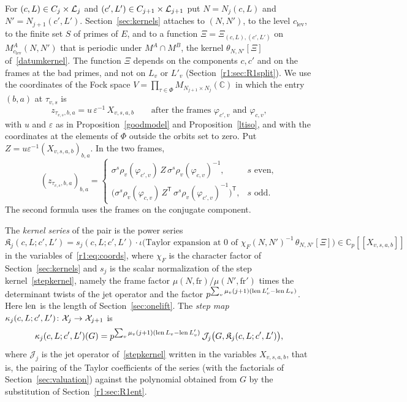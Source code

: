 For $(c,L)\in C_j\times\mathcal L_j$ and $(c',L')\in C_{j+1}\times\mathcal L_{j+1}$ put $N=N_j(c,L)$ and $N'=N_{j+1}(c',L')$. Section~\ref{sec:kernels} attaches to $(N,N')$, to the level $c_{\mathrm{lev}}$, to the finite set $S$ of primes of $E$, and to a function $\Xi=\Xi_{(c,L),(c',L')}$ on $M^A_{c_{\mathrm{lev}}}(N,N')$ that is periodic under $M^A\cap M^B$, the kernel $\theta_{N,N'}[\Xi]$ of~\eqref{datumkernel}. The function $\Xi$ depends on the components $c,c'$ and on the frames at the bad primes, and not on $L_v$ or $L'_v$ (Section~\ref{r1:sec:R1split}). We use the coordinates of the Fock space $V=\prod_{\tau\in\Phi}M_{N_{j+1}\times N_j}(\mathbb C)$ in which the entry $(b,a)$ at $\tau_{v,s}$ is
\begin{equation}\label{r1:eq:coords}
z_{\tau_{v,s},b,a}=u\,\varepsilon^{-1}\,X_{v,s,a,b}\qquad\text{after the frames }\varphi_{c',v}\text{ and }\varphi_{c,v},
\end{equation}
with $u$ and $\varepsilon$ as in Proposition~\ref{goodmodel} and Proposition~\ref{ltiso}, and with the coordinates at the elements of $\Phi$ outside the orbits set to zero. Put $Z=u\varepsilon^{-1}(X_{v,s,a,b})_{b,a}$. In the two frames,
\[
 (z_{\tau_{v,s},b,a})_{b,a}=
 \begin{cases}
 \sigma^s\rho_v(\varphi_{c',v})\,Z\,\sigma^s\rho_v(\varphi_{c,v})^{-1}, & s\text{ even},\\
 \big(\sigma^s\rho_v(\varphi_{c,v})\,Z^{\mathsf T}\,\sigma^s\rho_v(\varphi_{c',v})^{-1}\big)^{\mathsf T}, & s\text{ odd}.
 \end{cases}
\]
The second formula uses the frames on the conjugate component.

\begin{definition}\label{r1:def:kseries}
The \emph{kernel series} of the pair is the power series
\[
\mathfrak K_j(c,L;c',L')=s_j(c,L;c',L')\cdot\iota\Big(\text{Taylor expansion at }0\text{ of }\chi_F(N,N')^{-1}\,\theta_{N,N'}[\Xi]\Big)\in\mathbb C_p[[X_{v,s,a,b}]]
\]
in the variables of~\eqref{r1:eq:coords}, where $\chi_F$ is the character factor of Section~\ref{sec:kernels} and $s_j$ is the scalar normalization of the step kernel~\eqref{stepkernel}, namely the frame factor $\mu(N,\mathrm{fr})/\mu(N',\mathrm{fr}')$ times the determinant twists of the jet operator and the factor $p^{\sum_v\mu_v(j+1)(\operatorname{len} L'_v-\operatorname{len} L_v)}$. Here $\operatorname{len}$ is the length of Section~\ref{sec:onelift}. The \emph{step map} $\kappa_j(c,L;c',L')\colon\mathcal X_j\to\mathcal X_{j+1}$ is
\[
\kappa_j(c,L;c',L')(G)=p^{\sum_v\mu_v(j+1)(\operatorname{len} L_v-\operatorname{len} L'_v)}\,\mathcal J_j\big(G,\mathfrak K_j(c,L;c',L')\big),
\]
where $\mathcal J_j$ is the jet operator of~\eqref{stepkernel} written in the variables $X_{v,s,a,b}$, that is, the pairing of the Taylor coefficients of the series (with the factorials of Section~\ref{sec:valuation}) against the polynomial obtained from $G$ by the substitution of Section~\ref{r1:sec:R1ent}.
\end{definition}


